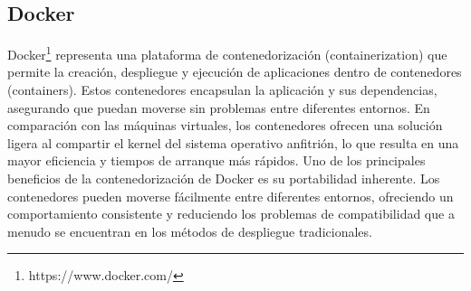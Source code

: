 \subsection{Docker}

Docker\footnote{https://www.docker.com/} representa una plataforma de contenedorización (containerization) que permite la creación, despliegue y ejecución de aplicaciones 
dentro de contenedores (containers). Estos contenedores encapsulan la aplicación y sus dependencias, asegurando que puedan moverse 
sin problemas entre diferentes entornos. En comparación con las máquinas virtuales, los contenedores ofrecen una 
solución ligera al compartir el kernel del sistema operativo anfitrión, lo que resulta en una mayor eficiencia y 
tiempos de arranque más rápidos. Uno de los principales beneficios de la contenedorización de Docker es su portabilidad 
inherente. Los contenedores pueden moverse fácilmente entre diferentes entornos, ofreciendo un comportamiento 
consistente y reduciendo los problemas de compatibilidad que a menudo se encuentran en los métodos de despliegue 
tradicionales.
